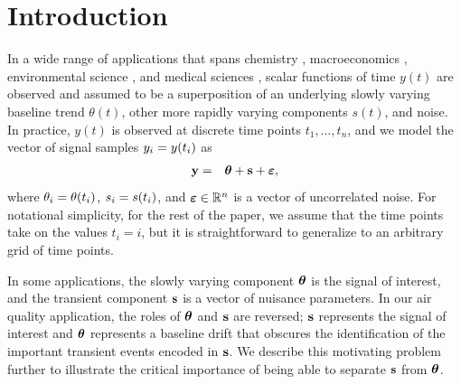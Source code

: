 \documentclass[aoas]{imsart}
\newcommand{\Real}{\mathbb{R}}
\newcommand{\V}[1]{{\bm{\mathbf{\MakeLowercase{#1}}}}} %
\newcommand{\VE}[2]{\MakeLowercase{#1}_{#2}} %
\begin{document}
\begin{frontmatter}

\begin{keyword}
\end{keyword}

\end{frontmatter}


\section{Introduction}
\label{sec:intro}

In a wide range of applications that spans chemistry \citep{Ning2014}, macroeconomics \citep{yamada2017estimating}, environmental science \citep{brantley2014mobile}, and medical sciences \citep{pettersson2013algorithm, marandi2015qualitative}, scalar functions of time $y(t)$ are observed and assumed to be a superposition of an underlying slowly varying baseline trend $\theta(t)$, other more rapidly varying components $s(t)$, and noise. In practice, $y(t)$ is observed at discrete time points $t_1, \ldots, t_n$, and we model the vector of signal samples $\VE{y}{i} = y(t_i)$ as
\begin{eqnarray*}
	\V{y} & = & \V{\theta} + \V{s} + \V{\varepsilon},
\end{eqnarray*}
where $\VE{\theta}{i} = \theta(t_i)$, $\VE{s}{i} = s(t_i)$, and $\V{\varepsilon} \in \Real^n$ is a vector of uncorrelated noise. For notational simplicity, for the rest of the paper, we assume that the time points take on the values $t_i = i$, but it is straightforward to generalize to an arbitrary grid of time points.

In some applications, the slowly varying component $\V{\theta}$ is the signal of interest, and the transient component $\V{s}$ is a vector of nuisance parameters. In our air quality application, the roles of $\V{\theta}$ and $\V{s}$ are reversed; $\V{s}$ represents the signal of interest and $\V{\theta}$ represents a baseline drift that obscures the identification of the important transient events encoded in $\V{s}$. We describe this motivating problem further to illustrate the critical importance of being able to separate $\V{s}$ from $\V{\theta}$.
\end{document}
